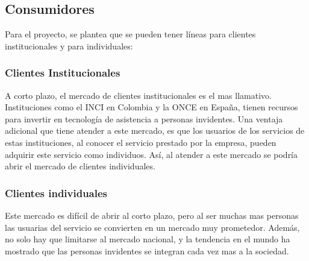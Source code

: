 \documentclass[a4paper, 12pt, oneside]{article}
\begin{document}
	\subsection{Consumidores}
	Para el proyecto, se plantea que se pueden tener líneas para clientes institucionales y para individuales:

	\subsubsection{Clientes Institucionales}
	A corto plazo, el mercado de clientes institucionales es el mas llamativo. Instituciones como el INCI en Colombia y la ONCE en España, tienen recursos para invertir en tecnología de asistencia a personas invidentes. Una ventaja adicional que tiene atender a este mercado, es que los usuarios de los servicios de estas instituciones, al conocer el servicio prestado por la empresa, pueden adquirir este servicio como individuos. Así, al atender a este mercado se podría abrir el mercado de clientes individuales.

	\subsubsection{Clientes individuales}
	Este mercado es difícil de abrir al corto plazo, pero al ser muchas mas personas las usuarias del servicio se convierten en un mercado muy prometedor. Además, no solo hay que limitarse al mercado nacional, y la tendencia en el mundo ha mostrado que las personas invidentes se integran cada vez mas a la sociedad.	
	
\end{document}
